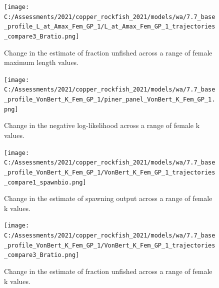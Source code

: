 \documentclass[11pt,
  english,
  a4paper,
]{article}
\begin{document}
\tagmcend\tagstructend


\begin{figure}
\centering
\texttt{[image: C:/Assessments/2021/copper\_rockfish\_2021/models/wa/7.7\_base\_profile\_L\_at\_Amax\_Fem\_GP\_1/L\_at\_Amax\_Fem\_GP\_1\_trajectories\_compare3\_Bratio.png]}
\caption{Change in the estimate of fraction unfished across a range of female maximum length values.\label{fig:linf-depl}}
\end{figure}

\tagmcend\tagstructend


\begin{figure}
\centering
\texttt{[image: C:/Assessments/2021/copper\_rockfish\_2021/models/wa/7.7\_base\_profile\_VonBert\_K\_Fem\_GP\_1/piner\_panel\_VonBert\_K\_Fem\_GP\_1.png]}
\caption{Change in the negative log-likelihood across a range of female k values.\label{fig:k-profile}}
\end{figure}

\tagmcend\tagstructend


\begin{figure}
\centering
\texttt{[image: C:/Assessments/2021/copper\_rockfish\_2021/models/wa/7.7\_base\_profile\_VonBert\_K\_Fem\_GP\_1/VonBert\_K\_Fem\_GP\_1\_trajectories\_compare1\_spawnbio.png]}
\caption{Change in the estimate of spawning output across a range of female k values.\label{fig:k-ssb}}
\end{figure}

\tagmcend\tagstructend


\begin{figure}
\centering
\texttt{[image: C:/Assessments/2021/copper\_rockfish\_2021/models/wa/7.7\_base\_profile\_VonBert\_K\_Fem\_GP\_1/VonBert\_K\_Fem\_GP\_1\_trajectories\_compare3\_Bratio.png]}
\caption{Change in the estimate of fraction unfished across a range of female k values.\label{fig:k-depl}}
\end{figure}
\end{document}
